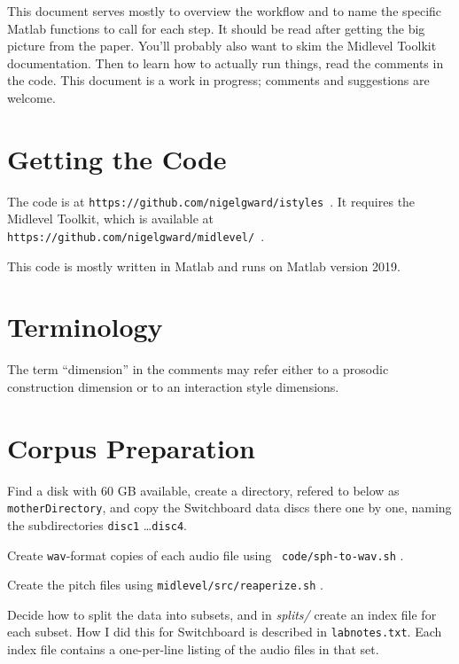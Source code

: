 \documentclass[11pt]{article}
\begin{document}
This document serves mostly to overview the workflow and to name the
specific Matlab functions to call for each step.  It should be read
after getting the big picture from the paper.  You'll probably also
want to skim the Midlevel Toolkit documentation.  Then to learn how to
actually run things, read the comments in the code. This document is a
work in progress; comments and suggestions are welcome.


\section{Getting the Code}  \label{sec:starting}

The code is at {\tt https://github.com/nigelgward/istyles }.  It requires
the Midlevel Toolkit, which is available at 
{\tt https://github.com/nigelgward/midlevel/ }.


This code is mostly written in Matlab and runs on Matlab version 2019.

\section{Terminology}

The term ``dimension'' in the comments may refer either to a prosodic
construction dimension or to an interaction style dimensions.

\section{Corpus Preparation }

Find a disk with 60 GB available, create a directory, refered to below
as {\tt motherDirectory}, and copy the Switchboard data discs there
one by one, naming the subdirectories {\tt disc1} \ldots {\tt disc4}.

Create {\tt wav}-format copies of each audio file using {\tt
  code/sph-to-wav.sh} .

Create the pitch files using {\tt midlevel/src/reaperize.sh} .

Decide how to split the data into subsets, and in {\it splits/} create
an index file for each subset. How I did this for Switchboard is described in
{\tt labnotes.txt}.  Each index file contains a one-per-line listing
of the audio files in that set.
\end{document}
